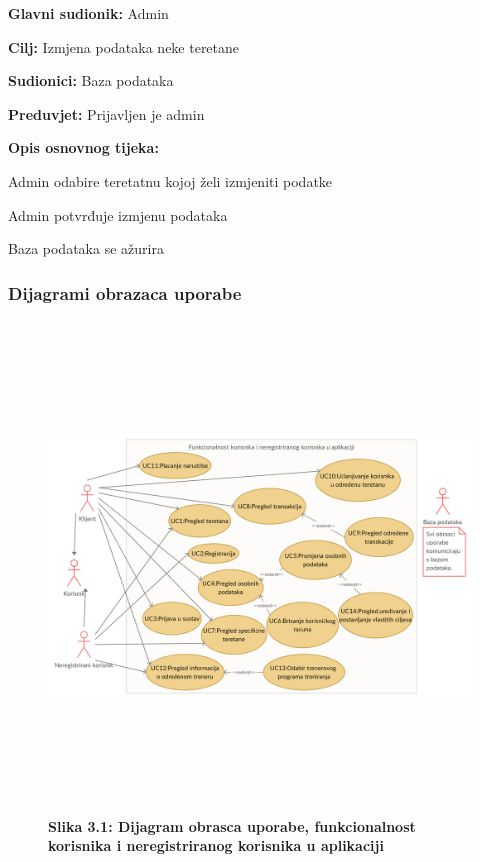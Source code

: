 				\noindent {}
				\begin{packed_item}
					
					\item \textbf{Glavni sudionik: } Admin
					\item  \textbf{Cilj:} Izmjena podataka neke teretane 
					\item  \textbf{Sudionici:} Baza podataka
					\item  \textbf{Preduvjet:} Prijavljen je admin
					\item  \textbf{Opis osnovnog tijeka:}
					
					\item[] \begin{packed_enum}
						
						\item Admin odabire teretatnu kojoj želi izmjeniti podatke
						\item Admin potvrđuje izmjenu podataka
						\item Baza podataka se ažurira
					\end{packed_enum}
				\end{packed_item}
				\eject
				
				
				\subsubsection{Dijagrami obrazaca uporabe}
				\begin{figure}[!htb]
					\includegraphics[height= 13cm,width=1.2\textwidth]{slike/obrazac1.jpg}
					\textbf{Slika 3.1: Dijagram obrasca uporabe, funkcionalnost korisnika i neregistriranog korisnika u aplikaciji  }
					
				\end{figure}
				
